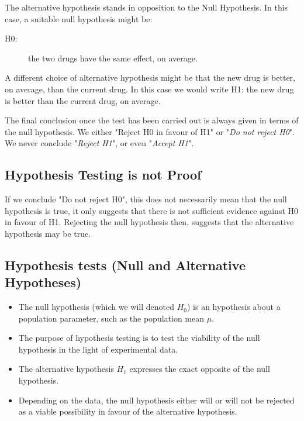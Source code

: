 \documentclass[]{article}
\begin{document}
The alternative hypothesis stands in opposition to the Null Hypothesis. In this case, a suitable null hypothesis might be:

\begin{description}
	\item[H0:] the two drugs have the same effect, on average.
\end{description}
A different choice of alternative hypothesis might be that the new drug is better, on average, than the current drug. In this case we would write H1: the new drug is better than the current drug, on average. 

The final conclusion once the test has been carried out is always given in terms of the null hypothesis. We either "Reject H0 in favour of H1" or "\textit{Do not reject H0}". We never conclude "\textit{Reject H1}", or even "\textit{Accept H1}".

\subsection{Hypothesis Testing is not Proof}
If we conclude "Do not reject H0", this does not necessarily mean that the null hypothesis is true, it only suggests that there is not sufficient evidence against H0 in favour of H1. Rejecting the null hypothesis then, suggests that the alternative hypothesis may be true.





\subsection{Hypothesis tests (Null and Alternative Hypotheses) }

\begin{itemize}
	\item The null hypothesis (which we will denoted $H_0$) is an hypothesis about a population parameter, such as the population mean $\mu$. \item The purpose of hypothesis testing is to test the viability of the null hypothesis in the light of experimental data. \item The alternative hypothesis $H_1$ expresses the exact opposite of the null hypothesis. \item Depending on the data, the null hypothesis either will or will not be rejected as a viable possibility in favour of the alternative hypothesis.
\end{itemize}
\end{document}
